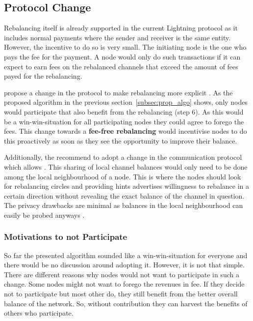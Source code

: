 \documentclass[final]{fhnwreport}       %
\begin{document}
\subsection{Protocol Change}
Rebalancing itself is already supported in the current Lightning protocol as it includes normal payments where the sender and receiver is the same entity. However, the incentive to do so is very small. The initiating node is the one who pays the fee for the payment. A node would only do such transactions if it can expect to earn fees on the rebalanced channels that exceed the amount of fees payed for the rebalancing. 

\citeauthor{pickhardt_imbalance_2019} propose a change in the protocol to make rebalancing more explicit \citep{pickhardt_imbalance_2019}. As the proposed algorithm in the previous section~\ref{subsec:prop_algo} shows, only nodes would participate that also benefit from the rebalancing (step 6). As this would be a win-win-situation for all participating nodes they could agree to forego the fees. This change towards a \textbf{fee-free rebalancing} would incentivise nodes to do this proactively as soon as they see the opportunity to improve their balance.

Additionally, the recommend to adopt a change in the communication protocol which allows . This sharing of local channel balances would only need to be done among the local neighbourhood of a node. This is where the nodes should look for rebalancing circles and providing hints advertises willingness to rebalance in a certain direction without revealing the exact balance of the channel in question. The privacy drawbacks are minimal as balances in the local neighbourhood can easily be probed anyways \citep{tikhomirov_probing_2020}. 
 
\subsubsection{Motivations to not Participate}
So far the presented algorithm sounded like a win-win-situation for everyone and there would be no discussion around adopting it. However, it is not that simple. There are different reasons why nodes would not want to participate in such a change. Some nodes might not want to forego the revenues in fee. If they decide not to participate but most other do, they still benefit from the better overall balance of the network. So, without contribution they can harvest the benefits of others who participate. 
\end{document}
